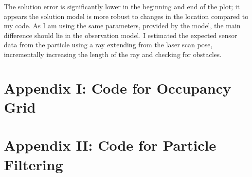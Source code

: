 \documentclass{article} %
\begin{document}
The solution error is significantly lower in the beginning and end of the plot; it appears the solution model is more robust to changes in the location compared to my code.
As I am using the same parameters, provided by the model, the main difference should lie in the observation model. I estimated the expected sensor data from the particle using a ray extending from the laser scan pose, incrementally increasing the length of the ray and checking for obstacles.

\clearpage
\section*{Appendix I: Code for Occupancy Grid}


\clearpage
\section*{Appendix II: Code for Particle Filtering}

\end{document}
